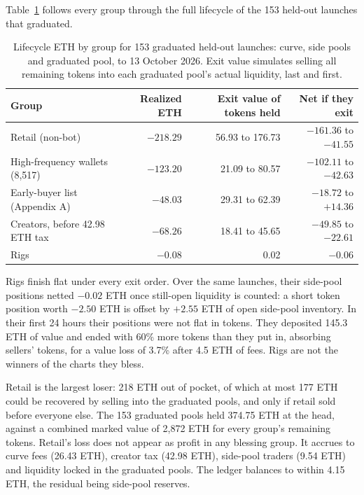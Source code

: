 \documentclass{ledger}
\begin{document}
Table~\ref{tab:drain} follows every group through the full lifecycle of the 153 held-out launches that graduated.

\begin{table}[h]
\centering\small
\caption{Lifecycle ETH by group for 153 graduated held-out launches: curve, side pools and graduated pool, to 13 October 2026. Exit value simulates selling all remaining tokens into each graduated pool's actual liquidity, last and first.}\label{tab:drain}
\begin{tabular}{@{}>{\raggedright\arraybackslash}p{4.4cm}rrr@{}}
\toprule
Group & Realized ETH & Exit value of tokens held & Net if they exit \\
\midrule
Retail (non-bot) & $-218.29$ & 56.93 to 176.73 & $-161.36$ to $-41.55$ \\
High-frequency wallets (8,517) & $-123.20$ & 21.09 to 80.57 & $-102.11$ to $-42.63$ \\
Early-buyer list (Appendix A) & $-48.03$ & 29.31 to 62.39 & $-18.72$ to $+14.36$ \\
Creators, before 42.98 ETH tax & $-68.26$ & 18.41 to 45.65 & $-49.85$ to $-22.61$ \\
Rigs & $-0.08$ & 0.02 & $-0.06$ \\
\bottomrule
\end{tabular}
\end{table}

Rigs finish flat under every exit order. Over the same launches, their side-pool positions netted $-0.02$ ETH once still-open liquidity is counted: a short token position worth $-2.50$ ETH is offset by $+2.55$ ETH of open side-pool inventory. In their first 24 hours their positions were not flat in tokens. They deposited 145.3 ETH of value and ended with 60\% more tokens than they put in, absorbing sellers' tokens, for a value loss of 3.7\% after 4.5 ETH of fees. Rigs are not the winners of the charts they bless.

Retail is the largest loser: 218 ETH out of pocket, of which at most 177 ETH could be recovered by selling into the graduated pools, and only if retail sold before everyone else. The 153 graduated pools held 374.75 ETH at the head, against a combined marked value of 2,872 ETH for every group's remaining tokens. Retail's loss does not appear as profit in any blessing group. It accrues to curve fees (26.43 ETH), creator tax (42.98 ETH), side-pool traders (9.54 ETH) and liquidity locked in the graduated pools. The ledger balances to within 4.15 ETH, the residual being side-pool reserves.
\end{document}
